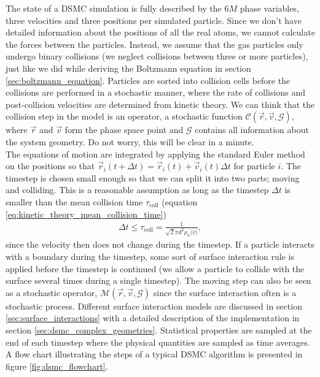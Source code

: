 The state of a DSMC simulation is fully described by the $6M$ phase variables, three velocities and three positions per simulated particle. Since we don't have detailed information about the positions of all the real atoms, we cannot calculate the forces between the particles. Instead, we assume that the gas particles only undergo binary collisions (we neglect collisions between three or more particles), just like we did while deriving the Boltzmann equation in section \ref{sec:boltzmann_equation}. Particles are sorted into collision cells before the collisions are performed in a stochastic manner, where the rate of collisions and post-collision velocities are determined from kinetic theory. We can think that the collision step in the model is an operator, a stochastic function $\mathcal{C}(\vec r, \vec v, \mathcal{G})$, where $\vec r$ and $\vec v$ form the phase space point and $\mathcal G$ contains all information about the system geometry. Do not worry, this will be clear in a minute.\\
The equations of motion are integrated by applying the standard Euler method on the positions so that $\vec r_i(t+\Delta t) = \vec r_i(t) + \vec v_i(t)\Delta t$ for particle $i$. The timestep is chosen small enough so that we can split it into two parts; moving and colliding. This is a reasonable assumption as long as the timestep $\Delta t$ is smaller than the mean collision time $\tau_\text{coll}$ (equation \eqref{eq:kinetic_theory_mean_collision_time})
\begin{align}
	\Delta t \leq \tau_\text{coll} = \frac{1}{\sqrt 2 \pi d^2 \rho_n \langle v \rangle},
\end{align}
since the velocity then does not change during the timestep. If a particle interacts with a boundary during the timestep, some sort of surface interaction rule is applied before the timestep is continued (we allow a particle to collide with the surface several times during a single timestep). The moving step can also be seen as a stochastic operator, $\mathcal{M}(\vec r, \vec v, \mathcal{G})$ since the surface interaction often is a stochastic process. Different surface interaction models are discussed in section \ref{sec:surface_interactions} with a detailed description of the implementation in section \ref{sec:dsmc_complex_geometries}. Statistical properties are sampled at the end of each timestep where the physical quantities are sampled as time averages. A flow chart illustrating the steps of a typical DSMC algorithm is presented in figure \ref{fig:dsmc_flowchart}.
